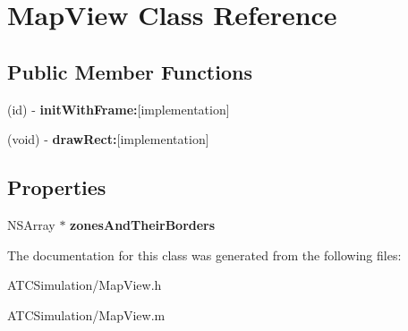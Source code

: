 \hypertarget{interface_map_view}{
\section{\-Map\-View \-Class \-Reference}
\label{interface_map_view}
}
\subsection*{\-Public \-Member \-Functions}
\begin{DoxyCompactItemize}
\item 
\hypertarget{interface_map_view_adafc42f011a20532370d0b5bd496ca84}{
(id) -\/ {\bfseries init\-With\-Frame\-:}{\ttfamily  \mbox{[}implementation\mbox{]}}}
\label{interface_map_view_adafc42f011a20532370d0b5bd496ca84}

\item 
\hypertarget{interface_map_view_ab2be3608429867bf56a79536e8f55bab}{
(void) -\/ {\bfseries draw\-Rect\-:}{\ttfamily  \mbox{[}implementation\mbox{]}}}
\label{interface_map_view_ab2be3608429867bf56a79536e8f55bab}

\end{DoxyCompactItemize}
\subsection*{\-Properties}
\begin{DoxyCompactItemize}
\item 
\hypertarget{interface_map_view_ad1775ca14d3283ce1ca025d0631795c0}{
\-N\-S\-Array $\ast$ {\bfseries zones\-And\-Their\-Borders}}
\label{interface_map_view_ad1775ca14d3283ce1ca025d0631795c0}

\end{DoxyCompactItemize}


\-The documentation for this class was generated from the following files\-:\begin{DoxyCompactItemize}
\item 
\-A\-T\-C\-Simulation/\-Map\-View.\-h\item 
\-A\-T\-C\-Simulation/\-Map\-View.\-m\end{DoxyCompactItemize}
